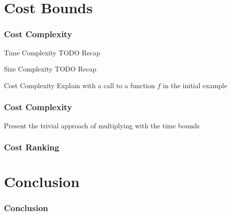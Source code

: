 \documentclass{beamer}
\begin{document}
\section{Cost Bounds}

\begin{frame}
  \frametitle{Cost Complexity}
  \begin{block}{Time Complexity}
    TODO Recap
  \end{block}
  \pause
  \begin{block}{Size Complexity}
    TODO Recap
  \end{block}
  \pause
  \begin{block}{Cost Complexity}
    Explain with a call to a function $f$ in the initial example 
  \end{block}
\end{frame}

\begin{frame}
  \frametitle{Cost Complexity}
  Present the trivial approach of multiplying with the time bounds
\end{frame}

\begin{frame}
  \frametitle{Cost Ranking}
\end{frame}

\section{Conclusion}

\begin{frame}
  \frametitle{Conclusion}
\end{frame}
\end{document}
